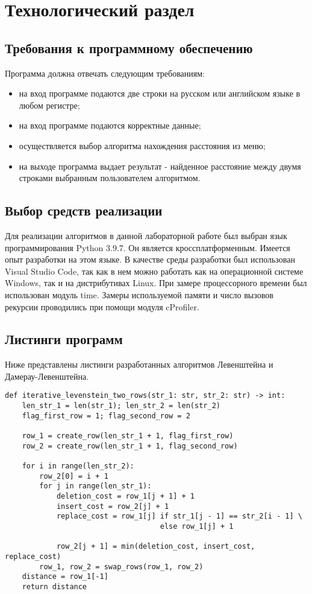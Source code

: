 \chapter{Технологический раздел}
\section{Требования к программному обеспечению}
Программа должна отвечать следующим требованиям:
\begin{itemize}
	\item на вход программе подаются две строки на русском или английском языке в любом регистре;
	\item на вход программе подаются корректные данные;
	\item осуществляется выбор алгоритма нахождения расстояния из меню;
	\item на выходе программа выдает результат - найденное расстояние между двумя строками выбранным пользователем алгоритмом.
\end{itemize}

\section{Выбор средств реализации}
Для реализации алгоритмов в данной лабораторной работе был выбран язык программирования Python 3.9.7\cite{python3}. Он является кроссплатформенным. Имеется опыт разработки на этом языке. В качестве среды разработки был использован Visual Studio Code\cite{vs}, так как в нем можно работать как на операционной системе Windows, так и на дистрибутивах Linux. При замере процессорного времени был использован модуль time\cite{time}. Замеры используемой памяти и число вызовов рекурсии проводились при помощи модуля cProfiler\cite{cprofile}.
\section{Листинги программ}
Ниже представлены листинги разработанных алгоритмов Левенштейна и Дамерау-Левенштейна.
\newpage
\begin{lstlisting}[label=some-code,caption=Программный код нахождения расстояния Левенштейна итеративно с использованием двух строк]
def iterative_levenstein_two_rows(str_1: str, str_2: str) -> int:
	len_str_1 = len(str_1); len_str_2 = len(str_2)
	flag_first_row = 1; flag_second_row = 2
	
	row_1 = create_row(len_str_1 + 1, flag_first_row)
	row_2 = create_row(len_str_1 + 1, flag_second_row)
	
	for i in range(len_str_2):
		row_2[0] = i + 1
		for j in range(len_str_1):
			deletion_cost = row_1[j + 1] + 1
			insert_cost = row_2[j] + 1
			replace_cost = row_1[j] if str_1[j - 1] == str_2[i - 1] \
									else row_1[j] + 1
	
			row_2[j + 1] = min(deletion_cost, insert_cost, replace_cost)
		row_1, row_2 = swap_rows(row_1, row_2)
	distance = row_1[-1]
	return distance
\end{lstlisting}

